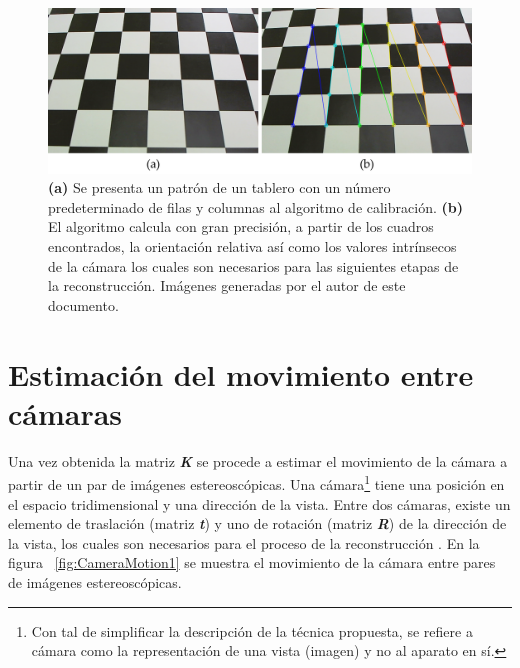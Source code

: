 \begin{figure}[H]
\centering
\includegraphics[width=1.0\textwidth]{images/acalibration0.png}
\caption[Calibraci\'{o}n usando tablero]%
{\textbf{(a)} Se presenta un patr\'{o}n de un tablero con un n\'{u}mero predeterminado de filas y columnas al algoritmo de calibraci\'{o}n. \textbf{(b)} El algoritmo calcula con gran precisi\'{o}n, a partir de los cuadros encontrados, la orientaci\'{o}n relativa as\'{i} como los valores intr\'{i}nsecos de la c\'{a}mara los cuales son necesarios para las siguientes etapas de la reconstrucci\'{o}n. Im\'{a}genes generadas por el autor de este documento.}
\label{fig:ACalibration1}
\end{figure}


\section{Estimaci\'{o}n del movimiento entre c\'{a}maras}
Una vez obtenida la matriz \textbf{\textit{K}} se procede a estimar el movimiento de la c\'{a}mara a partir de un par de im\'{a}genes estereosc\'{o}picas. Una c\'{a}mara\footnote{Con tal de simplificar la descripci\'{o}n de la t\'{e}cnica propuesta, se refiere a c\'{a}mara como la representaci\'{o}n de una vista (imagen) y no al aparato en s\'{i}.} tiene una posici\'{o}n en el espacio tridimensional y una direcci\'{o}n de la vista. Entre dos c\'{a}maras, existe un elemento de traslaci\'{o}n (matriz \textit{\textbf{t}}) y uno de rotaci\'{o}n (matriz \textit{\textbf{R}}) de la direcci\'{o}n de la vista, los cuales son necesarios para el proceso de la reconstrucci\'{o}n \cite{Faugeras_Luong_2001,Hartley_Zisserman_2003,Faugeras_1993}. En la figura ~\ref{fig:CameraMotion1} se muestra el movimiento de la c\'{a}mara entre pares de im\'{a}genes estereosc\'{o}picas.


